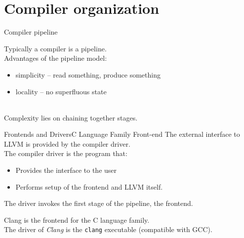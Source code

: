 
\section{Compiler organization}


\begin{frame}{Compiler pipeline}
\begin{center}
Typically a compiler is a \alert{pipeline}.\\
\bigskip
Advantages of the pipeline model:\\
\medskip
\begin{varwidth}{0.8\textwidth}
\begin{itemize}
\item \alert{simplicity} -- read something, produce something
\item \alert{locality} -- no superfluous state
\end{itemize}
\end{varwidth}
\\
\bigskip
Complexity lies on \alert{chaining} together stages.
\end{center}
\end{frame}


\begin{frame}{Frontends and Drivers}{C Language Family Front-end}
The external interface to LLVM is provided by the \alert{compiler driver}.\\
\bigskip
The \alert{compiler driver} is the program that:
\begin{itemize}
\item Provides the interface to the user
\item Performs setup of the frontend and LLVM itself. 
\end{itemize}
\bigskip
The driver invokes the \alert{first stage of the pipeline}, the \alert{frontend}.
\begin{example}
\alert{Clang}\cite{LOCAL:www/clang} is the frontend for the C language family.\\
The driver of \emph{Clang} is the \texttt{clang} executable (compatible with GCC).\\
\smallskip %
\end{example}
\end{frame}



